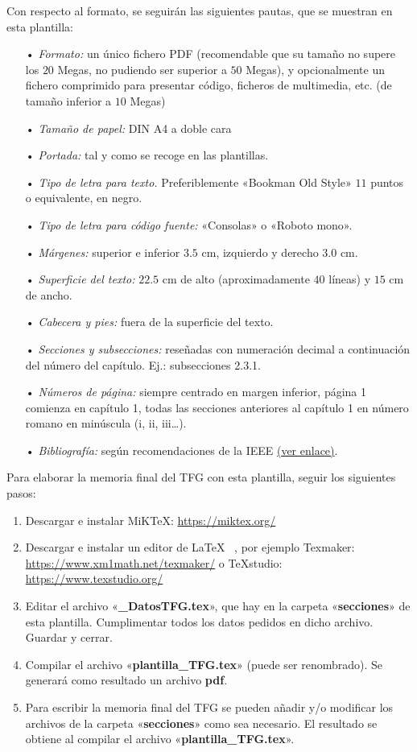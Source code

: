 Con respecto al formato, se seguirán las siguientes pautas, que se muestran en esta plantilla:
\begin{itemize}
\item[•] \textit{Formato:} un único fichero PDF (recomendable que su tamaño no supere los $20$ Megas, no pudiendo ser superior a $50$ Megas), y opcionalmente un fichero comprimido para presentar código, ficheros de multimedia, etc. (de tamaño inferior a $10$ Megas)
\item[•] \textit{Tamaño de papel:} DIN A4 a doble cara
\item[•] \textit{Portada:} tal y como se recoge en las plantillas.
\item[•] \textit{Tipo de letra para texto.} Preferiblemente «Bookman Old Style» $11$ puntos o equivalente, en negro.
\item[•] \textit{Tipo de letra para código fuente:} «Consolas» o «Roboto mono».
\item[•] \textit{Márgenes:} superior e inferior $3.5$ cm, izquierdo y derecho $3.0$ cm.
\item[•] \textit{Superficie del texto:} $22.5$ cm de alto (aproximadamente $40$ líneas) y $15$ cm de ancho.
\item[•] \textit{Cabecera y pies:} fuera de la superficie del texto.
\item[•] \textit{Secciones y subsecciones:} reseñadas con numeración decimal a continuación del número del capítulo. Ej.: subsecciones 2.3.1.
\item[•] \textit{Números de página:} siempre centrado en margen inferior, página 1 comienza en capítulo 1, todas las secciones anteriores al capítulo 1 en número romano en minúscula (i, ii, iii…).
\item[•] \textit{Bibliografía:} según recomendaciones de la IEEE 
\href{https://www.etsiinf.upm.es/docs/estudios/grado/1475_ieeecitationref.pdf}{(ver enlace)}.
\end{itemize}

\vspace*{1.5cm}
Para elaborar la memoria final del TFG con esta plantilla, seguir los siguientes pasos:
\begin{enumerate}
\item Descargar e instalar MiKTeX:  \url{https://miktex.org/}
\item Descargar e instalar un editor de \LaTeX~ , por ejemplo Texmaker:
\url{https://www.xm1math.net/texmaker/} o TeXstudio: \url{https://www.texstudio.org/}

\item Editar el archivo «\textbf{\_DatosTFG.tex}», que hay en la carpeta «\textbf{secciones}» de esta plantilla. Cumplimentar todos los datos pedidos en dicho archivo. Guardar y cerrar.
\item Compilar el archivo «\textbf{plantilla\_TFG.tex}» (puede ser renombrado). Se generará como resultado un archivo \textbf{pdf}.
\item Para escribir la memoria final del TFG se pueden añadir y/o modificar los archivos de la carpeta «\textbf{secciones}» como sea necesario. El resultado se obtiene al compilar el archivo «\textbf{plantilla\_TFG.tex}». 
\end{enumerate}

